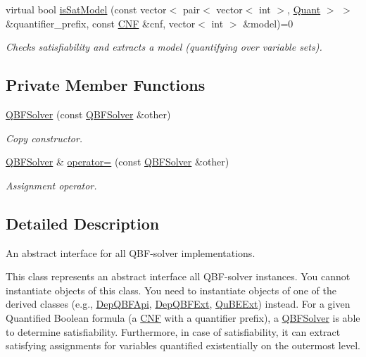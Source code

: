 \begin{DoxyCompactItemize}
virtual bool \hyperlink{classQBFSolver_a12f2ce57b778b9efe729d63bf881493d}{is\-Sat\-Model} (const vector$<$ pair$<$ vector$<$ int $>$, \hyperlink{classQBFSolver_ac091e263cb55286cc07b2451bcf4d3c7}{Quant} $>$ $>$ \&quantifier\-\_\-prefix, const \hyperlink{classCNF}{C\-N\-F} \&cnf, vector$<$ int $>$ \&model)=0
\begin{DoxyCompactList}\small\item\em Checks satisfiability and extracts a model (quantifying over variable sets). \end{DoxyCompactList}\end{DoxyCompactItemize}
\subsection*{Private Member Functions}
\begin{DoxyCompactItemize}
\item 
\hyperlink{classQBFSolver_a37724e17445199de54e0b78307214e78}{Q\-B\-F\-Solver} (const \hyperlink{classQBFSolver}{Q\-B\-F\-Solver} \&other)
\begin{DoxyCompactList}\small\item\em Copy constructor. \end{DoxyCompactList}\item 
\hyperlink{classQBFSolver}{Q\-B\-F\-Solver} \& \hyperlink{classQBFSolver_a0ee7d775a4f07b088924e9e31d800a53}{operator=} (const \hyperlink{classQBFSolver}{Q\-B\-F\-Solver} \&other)
\begin{DoxyCompactList}\small\item\em Assignment operator. \end{DoxyCompactList}\end{DoxyCompactItemize}


\subsection{Detailed Description}
An abstract interface for all Q\-B\-F-\/solver implementations. 

This class represents an abstract interface all Q\-B\-F-\/solver instances. You cannot instantiate objects of this class. You need to instantiate objects of one of the derived classes (e.\-g., \hyperlink{classDepQBFApi}{Dep\-Q\-B\-F\-Api}, \hyperlink{classDepQBFExt}{Dep\-Q\-B\-F\-Ext}, \hyperlink{classQuBEExt}{Qu\-B\-E\-Ext}) instead. For a given Quantified Boolean formula (a \hyperlink{classCNF}{C\-N\-F} with a quantifier prefix), a \hyperlink{classQBFSolver}{Q\-B\-F\-Solver} is able to determine satisfiability. Furthermore, in case of satisfiability, it can extract satisfying assignments for variables quantified existentially on the outermost level. 

